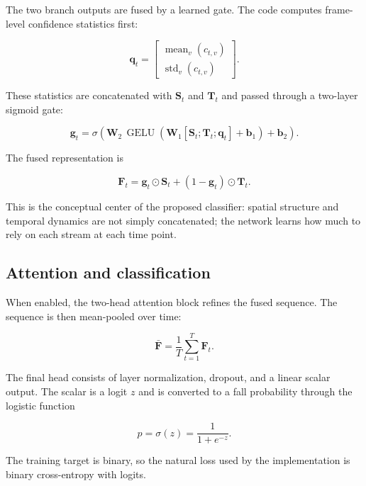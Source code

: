 \documentclass[11pt,a4paper]{article}
\begin{document}
The two branch outputs are fused by a learned gate. The code computes frame-level confidence statistics first:

\begin{equation}
\mathbf{q}_t
=
\begin{bmatrix}
\operatorname{mean}_{v}(c_{t,v})\\
\operatorname{std}_{v}(c_{t,v})
\end{bmatrix}.
\end{equation}

These statistics are concatenated with $\mathbf{S}_t$ and $\mathbf{T}_t$ and passed through a two-layer sigmoid gate:

\begin{equation}
\mathbf{g}_t
=
\sigma
\left(
\mathbf{W}_2
\,\operatorname{GELU}
\left(
\mathbf{W}_1
[\mathbf{S}_t;\mathbf{T}_t;\mathbf{q}_t]
+\mathbf{b}_1
\right)
+\mathbf{b}_2
\right).
\end{equation}

The fused representation is

\begin{equation}
\mathbf{F}_t
=
\mathbf{g}_t\odot\mathbf{S}_t
+
(1-\mathbf{g}_t)\odot\mathbf{T}_t.
\end{equation}

This is the conceptual center of the proposed classifier: spatial structure and temporal dynamics are not simply concatenated; the network learns how much to rely on each stream at each time point.

\subsection{Attention and classification}

When enabled, the two-head attention block refines the fused sequence. The sequence is then mean-pooled over time:

\begin{equation}
\bar{\mathbf{F}}
=
\frac{1}{T}
\sum_{t=1}^{T}\mathbf{F}_t.
\end{equation}

The final head consists of layer normalization, dropout, and a linear scalar output. The scalar is a logit $z$ and is converted to a fall probability through the logistic function

\begin{equation}
p
=
\sigma(z)
=
\frac{1}{1+e^{-z}}.
\end{equation}

The training target is binary, so the natural loss used by the implementation is binary cross-entropy with logits.
\end{document}
